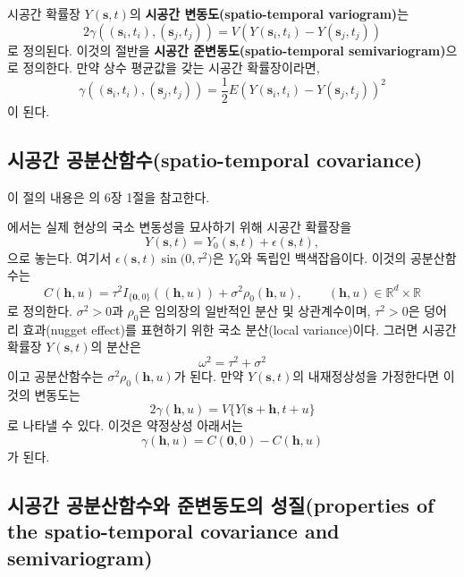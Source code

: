 \documentclass[b5paper,]{scrbook}
\theoremstyle{plain}
\theoremstyle{definition}
\numberwithin{equation}{section}
\let\BeginKnitrBlock\begin \let\EndKnitrBlock\end
\begin{document}
\BeginKnitrBlock{definition}[시공간 변동도]
\protect\hypertarget{def:unnamed-chunk-379}{}{\label{def:unnamed-chunk-379} {} }시공간 확률장 \(Y(\mathbf{s},t)\)의 \textbf{시공간 변동도(spatio-temporal variogram)}는
\[2\gamma((\mathbf{s}_{i},t_{i}), (\mathbf{s}_{j},t_{j}))=V(Y(\mathbf{s}_{i},t_{i})-Y(\mathbf{s}_{j},t_{j}))\]
로 정의된다. 이것의 절반을 \textbf{시공간 준변동도(spatio-temporal semivariogram)}으로 정의한다. 만약 상수 평균값을 갖는 시공간 확률장이라면,
\[\gamma((\mathbf{s}_{i},t_{i}), (\mathbf{s}_{j},t_{j}))=\frac{1}{2}E(Y(\mathbf{s}_{i},t_{i})-Y(\mathbf{s}_{j},t_{j}))^{2}\]
이 된다.
\EndKnitrBlock{definition}

\hypertarget{-spatio-temporal-covariance}{%
\subsection{시공간 공분산함수(spatio-temporal covariance)}\label{-spatio-temporal-covariance}}

이 절의 내용은 \citep{Cressie2015}의 6장 1절을 참고한다.

\citep{Padoan2015}에서는 실제 현상의 국소 변동성을 묘사하기 위해 시공간 확률장을
\[Y(\mathbf{s}, t)=Y_{0}(\mathbf{s},t) +\epsilon (\mathbf{s},t),\]
으로 놓는다. 여기서 \(\epsilon(\mathbf{s},t)\sin\mathcal(0,\tau^{2})\)은 \(Y_{0}\)와 독립인 백색잡읍이다. 이것의 공분산함수는
\[C(\mathbf{h},u)=\tau^{2}I_{\{\mathbf{0},0\}}((\mathbf{h},u))+\sigma^{2}\rho_{0}(\mathbf{h},u), \qquad{(\mathbf{h},u)\in\mathbb{R}^{d}\times \mathbb{R}}\]
로 정의한다. \(\sigma^{2}>0\)과 \(\rho_{0}\)은 임의장의 일반적인 분산 및 상관계수이며, \(\tau^{2}>0\)은 덩어리 효과(nugget effect)를 표현하기 위한 국소 분산(local variance)이다. 그러면 시공간 확률장 \(Y(\mathbf{s},t)\)의 분산은
\[\omega^{2}=\tau^{2}+\sigma^{2}\]
이고 공분산함수는 \(\sigma^{2}\rho_{0}(\mathbf{h},u)\)가 된다. 만약 \(Y(\mathbf{s},t)\)의 내재정상성을 가정한다면 이것의 변동도는
\[2\gamma(\mathbf{h},u)=V\{ Y(\mathbf{s}+\mathbf{h}, t+u\}\]
로 나타낼 수 있다. 이것은 약정상성 아래서는
\[\gamma(\mathbf{h},u)=C(\mathbf{0},0) - C(\mathbf{h}, u)\]
가 된다.

\hypertarget{---properties-of-the-spatio-temporal-covariance-and-semivariogram}{%
\subsection{시공간 공분산함수와 준변동도의 성질(properties of the spatio-temporal covariance and semivariogram)}\label{---properties-of-the-spatio-temporal-covariance-and-semivariogram}}
\end{document}
